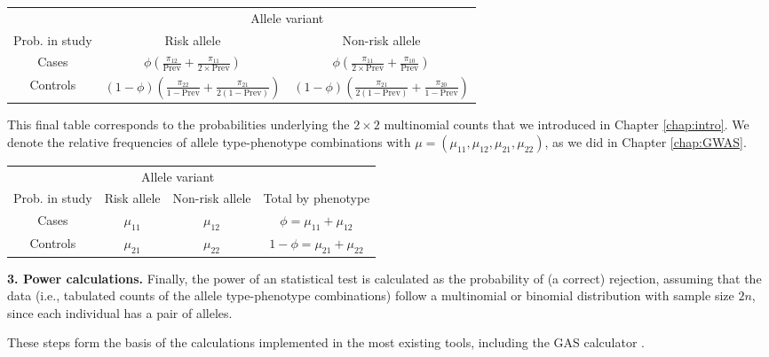 \begin{center}
    \begin{tabular}{ccc}
    \hline
    & \multicolumn{2}{c}{Allele variant} \\
    \cline{2-3}
    Prob. in study & Risk allele & Non-risk allele \\
    \hline
    Cases & $\phi\left(\frac{\pi_{12}}{\text{Prev}}+\frac{\pi_{11}}{2\times\text{Prev}}\right)$ & $\phi\left(\frac{\pi_{11}}{2\times\text{Prev}}+\frac{\pi_{10}}{\text{Prev}}\right)$ \\
    Controls & $(1-\phi)\left(\frac{\pi_{22}}{1-\text{Prev}}+\frac{\pi_{21}}{2(1-\text{Prev})}\right)$ & $(1-\phi)\left(\frac{\pi_{21}}{2(1-\text{Prev})}+\frac{\pi_{20}}{1-\text{Prev}}\right)$ \\
    \hline
    \end{tabular}
\end{center}

This final table corresponds to the probabilities underlying the $2\times2$ multinomial counts that we introduced in Chapter \ref{chap:intro}.
We denote the relative frequencies of allele type-phenotype combinations with $\mu = (\mu_{11}, \mu_{12}, \mu_{21}, \mu_{22})$, as we did in Chapter \ref{chap:GWAS}.

\begin{center}
    \begin{tabular}{cccc}
    \hline
    & \multicolumn{2}{c}{Allele variant} & \\
    \cline{2-3}
    Prob. in study & Risk allele & Non-risk allele & Total by phenotype \\
    \hline
    Cases & $\mu_{11}$ & $\mu_{12}$ & $\phi = \mu_{11} + \mu_{12}$ \\
    Controls & $\mu_{21}$ & $\mu_{22}$ & $1-\phi = \mu_{21} + \mu_{22}$ \\
    \hline
    \end{tabular}
\end{center}

\bigskip
{\bf 3. Power calculations.}
Finally, the power of an statistical test is calculated as the probability of (a correct) rejection, assuming that the data (i.e., tabulated counts of the allele type-phenotype combinations) follow a multinomial or binomial distribution with sample size $2n$, since each individual has a pair of alleles.

These steps form the basis of the calculations implemented in the most existing tools, including the GAS calculator \citep{johnson2017gas}.


